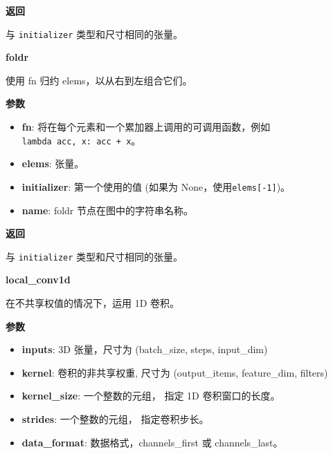 \textbf{返回}

与 \texttt{initializer} 类型和尺寸相同的张量。


\textbf{foldr}\label{foldr}

\begin{Shaded}
\begin{Highlighting}[]
\OperatorTok{=}\OperatorTok{=}\NormalTok{)}
\end{Highlighting}
\end{Shaded}

使用 fn 归约 elems，以从右到左组合它们。

\textbf{参数}

\begin{itemize}
\tightlist
\item
  \textbf{fn}: 将在每个元素和一个累加器上调用的可调用函数，例如
  \texttt{lambda\ acc,\ x:\ acc\ +\ x}。
\item
  \textbf{elems}: 张量。
\item
  \textbf{initializer}: 第一个使用的值 (如果为
  None，使用\texttt{elems{[}-1{]}})。
\item
  \textbf{name}: foldr 节点在图中的字符串名称。
\end{itemize}

\textbf{返回}

与 \texttt{initializer} 类型和尺寸相同的张量。


\textbf{local\_conv1d}\label{localux5fconv1d}

\begin{Shaded}
\begin{Highlighting}[]
\OperatorTok{=}\NormalTok{)}
\end{Highlighting}
\end{Shaded}

在不共享权值的情况下，运用 1D 卷积。

\textbf{参数}

\begin{itemize}
\tightlist
\item
  \textbf{inputs}: 3D 张量，尺寸为 (batch\_size, steps, input\_dim)
\item
  \textbf{kernel}: 卷积的非共享权重, 尺寸为 (output\_items,
  feature\_dim, filters)
\item
  \textbf{kernel\_size}: 一个整数的元组， 指定 1D 卷积窗口的长度。
\item
  \textbf{strides}: 一个整数的元组， 指定卷积步长。
\item
  \textbf{data\_format}: 数据格式，channels\_first 或 channels\_last。
\end{itemize}

